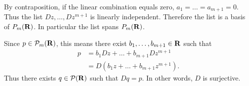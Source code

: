 \documentclass[a5paper]{article}
\begin{document}
    By contraposition, if the linear combination equals zero, $a_1=\dots=a_{m+1}=0$.
    Thus the list $Dz,\dots,Dz^{m+1}$ is linearly independent.
    Therefore the list is a basis of $P_m(\mathbf{R})$.
    In particular the list spans $P_m(\mathbf{R})$.

    Since $p \in \mathcal{P}_m(\mathbf{R})$, this means there exist $b_1,\dots,b_{m+1}\in\mathbf{R}$ such that
\begin{align*}
        p &= b_1Dz + \dots + b_{m+1}Dz^{m+1} \\
          &= D(b_1z + \dots + b_{m+1}z^{m+1}) .
\end{align*}
    Thus there exists $q \in \mathcal{P}(\mathbf{R})$ such that $Dq = p$.
    In other words, $D$ is surjective.
%
%
\end{document}
